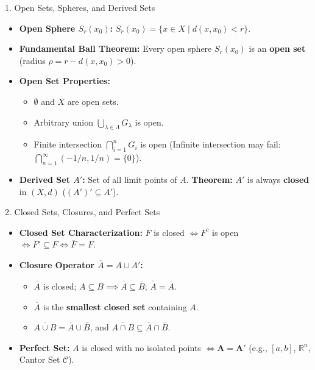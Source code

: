 \documentclass[11pt,a4paper]{article}
\begin{document}
\begin{formulabox}{1. Open Sets, Spheres, and Derived Sets}
\begin{itemize}
    \item \textbf{Open Sphere $S_r(x_0)$:} $S_r(x_0) = \{x \in X \mid d(x, x_0) < r\}$.
    \item \textbf{Fundamental Ball Theorem:} Every open sphere $S_r(x_0)$ is an \textbf{open set} (radius $\rho = r - d(x, x_0) > 0$).
    \item \textbf{Open Set Properties:}
    \begin{itemize}
        \item $\emptyset$ and $X$ are open sets.
        \item Arbitrary union $\bigcup_{\lambda \in \Lambda} G_\lambda$ is open.
        \item Finite intersection $\bigcap_{i=1}^n G_i$ is open (Infinite intersection may fail: $\bigcap_{n=1}^\infty (-1/n, 1/n) = \{0\}$).
    \end{itemize}
    \item \textbf{Derived Set $A'$:} Set of all limit points of $A$. \textbf{Theorem:} $A'$ is always \textbf{closed} in $(X, d)$ ($(A')' \subseteq A'$).
\end{itemize}
\end{formulabox}

\begin{defbox}{2. Closed Sets, Closures, and Perfect Sets}
\begin{itemize}
    \item \textbf{Closed Set Characterization:} $F$ is closed $\iff F^c$ is open $\iff F' \subseteq F \iff \overline{F} = F$.
    \item \textbf{Closure Operator $\overline{A} = A \cup A'$:}
    \begin{itemize}
        \item $\overline{A}$ is closed; $A \subseteq B \implies \overline{A} \subseteq \overline{B}$; $\overline{\overline{A}} = \overline{A}$.
        \item $\overline{A}$ is the \textbf{smallest closed set} containing $A$.
        \item $\overline{A \cup B} = \overline{A} \cup \overline{B}$, and $\overline{A \cap B} \subseteq \overline{A} \cap \overline{B}$.
    \end{itemize}
    \item \textbf{Perfect Set:} $A$ is closed with no isolated points $\iff \mathbf{A = A'}$ (e.g., $[a, b]$, $\mathbb{R}^n$, Cantor Set $\mathcal{C}$).
\end{itemize}
\end{defbox}
\end{document}
